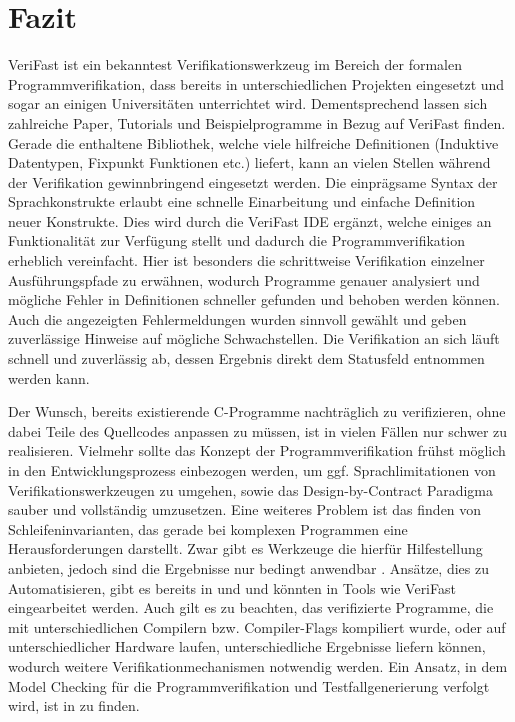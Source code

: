 \section{Fazit}

VeriFast ist ein bekanntest Verifikationswerkzeug im Bereich der formalen Programmverifikation, dass bereits in unterschiedlichen Projekten eingesetzt und sogar an einigen Universitäten unterrichtet wird. Dementsprechend lassen sich zahlreiche Paper, Tutorials und Beispielprogramme in Bezug auf VeriFast finden. Gerade die enthaltene Bibliothek, welche viele hilfreiche Definitionen (Induktive Datentypen, Fixpunkt Funktionen etc.) liefert, kann an vielen Stellen während der Verifikation gewinnbringend eingesetzt werden. Die einprägsame Syntax der Sprachkonstrukte erlaubt eine schnelle Einarbeitung und einfache Definition neuer Konstrukte. Dies wird durch die VeriFast IDE ergänzt, welche einiges an Funktionalität zur Verfügung stellt und dadurch die Programmverifikation erheblich vereinfacht. Hier ist besonders die schrittweise Verifikation einzelner Ausführungspfade zu erwähnen, wodurch Programme genauer analysiert und mögliche Fehler in Definitionen schneller gefunden und behoben werden können. Auch die angezeigten Fehlermeldungen wurden sinnvoll gewählt und geben zuverlässige Hinweise auf mögliche Schwachstellen. Die Verifikation an sich läuft schnell und zuverlässig ab, dessen Ergebnis direkt dem Statusfeld entnommen werden kann.

Der Wunsch, bereits existierende C-Programme nachträglich zu verifizieren, ohne dabei Teile des Quellcodes anpassen zu müssen, ist in vielen Fällen nur schwer zu realisieren. Vielmehr sollte das Konzept der Programmverifikation frühst möglich in den Entwicklungsprozess einbezogen werden, um ggf. Sprachlimitationen von Verifikationswerkzeugen zu umgehen, sowie das Design-by-Contract Paradigma sauber und vollständig umzusetzen. Eine weiteres Problem ist das finden von Schleifeninvarianten, das gerade bei komplexen Programmen eine Herausforderungen darstellt. Zwar gibt es Werkzeuge die hierfür Hilfestellung anbieten, jedoch sind die Ergebnisse nur bedingt anwendbar \cite{Crocker2007}. Ansätze, dies zu Automatisieren, gibt es bereits in \cite{Leino2005} und \cite{Stark1990} und könnten in Tools wie VeriFast eingearbeitet werden. Auch gilt es zu beachten, das verifizierte Programme, die mit unterschiedlichen Compilern bzw. Compiler-Flags kompiliert wurde, oder auf unterschiedlicher Hardware laufen, unterschiedliche Ergebnisse liefern können, wodurch weitere Verifikationmechanismen notwendig werden. Ein Ansatz, in dem Model Checking für die Programmverifikation und Testfallgenerierung verfolgt wird, ist in \cite{Kandl2007} zu finden.